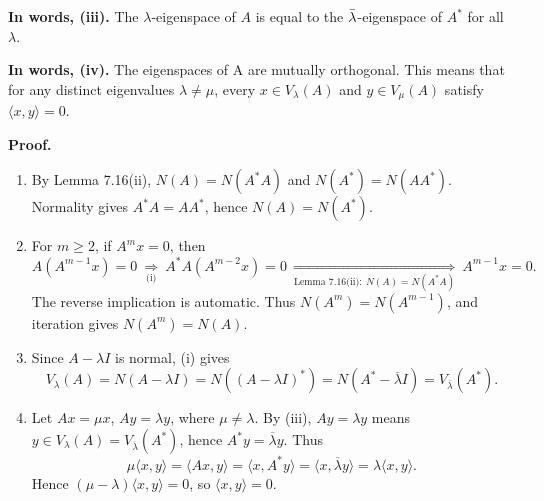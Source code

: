 \documentclass[11pt,a4paper]{article}
\newenvironment{proofsteps}{\begin{enumerate}\setlength{\itemsep}{4pt}}{\end{enumerate}}
\begin{document}
\begin{personalnote}
\textbf{In words, (iii).} The $\lambda$-eigenspace of $A$ is equal to the $\Bar{\lambda}$-eigenspace of $A^*$ for all $\lambda$.

\medskip
\textbf{In words, (iv).} The eigenspaces of A are mutually orthogonal. This means that for any distinct eigenvalues \(\lambda\neq\mu\), every \(x\in V_\lambda(A)\) and \(y\in V_\mu(A)\) satisfy \(\langle x,y\rangle=0\).
\end{personalnote}
\textbf{Proof.}
\begin{proofsteps}
\item[(i)] By Lemma 7.16(ii), \(N(A)=N(A^*A)\) and \(N(A^*)=N(AA^*)\).
Normality gives \(A^*A=AA^*\), hence \(N(A)=N(A^*)\).
\item[(ii)] For \(m\geq2\), if \(A^mx=0\), then
\[
A(A^{m-1}x)=0
\ \underset{\text{(i)}}{\Longrightarrow}\
A^*A(A^{m-2}x)=0
\ \underset{\text{Lemma 7.16(ii)}:\ N(A)=N(A^*A)}{\Longrightarrow}\
A^{m-1}x=0.
\]
The reverse implication is automatic. Thus \(N(A^m)=N(A^{m-1})\), and iteration gives \(N(A^m)=N(A)\).
\item[(iii)] Since \(A-\lambda I\) is normal, (i) gives
\[
V_\lambda(A)=N(A-\lambda I)
=N((A-\lambda I)^*)
=N(A^*-\overline\lambda I)
=V_{\overline\lambda}(A^*).
\]
\item[(iv)] Let \(Ax=\mu x\), \(Ay=\lambda y\), where \(\mu\neq\lambda\).
By (iii), \(Ay=\lambda y\) means \(y\in V_\lambda(A)=V_{\overline\lambda}(A^*)\), hence \(A^*y=\overline\lambda y\). Thus
\[
\mu\langle x,y\rangle
=\langle Ax,y\rangle
=\langle x,A^*y\rangle
=\langle x,\overline\lambda y\rangle
=\lambda\langle x,y\rangle.
\]
Hence \((\mu-\lambda)\langle x,y\rangle=0\), so \(\langle x,y\rangle=0\).
\end{proofsteps}
\end{document}
